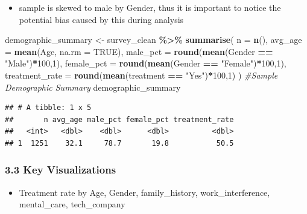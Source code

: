 \documentclass[
]{article}
\newenvironment{Shaded}{\begin{snugshade}}{\end{snugshade}}
\newcommand{\AttributeTok}[1]{\textcolor[rgb]{0.13,0.29,0.53}{#1}}
\newcommand{\CommentTok}[1]{\textcolor[rgb]{0.56,0.35,0.01}{\textit{#1}}}
\newcommand{\ConstantTok}[1]{\textcolor[rgb]{0.56,0.35,0.01}{#1}}
\newcommand{\DecValTok}[1]{\textcolor[rgb]{0.00,0.00,0.81}{#1}}
\newcommand{\FunctionTok}[1]{\textcolor[rgb]{0.13,0.29,0.53}{\textbf{#1}}}
\newcommand{\NormalTok}[1]{#1}
\newcommand{\OtherTok}[1]{\textcolor[rgb]{0.56,0.35,0.01}{#1}}
\newcommand{\SpecialCharTok}[1]{\textcolor[rgb]{0.81,0.36,0.00}{\textbf{#1}}}
\newcommand{\StringTok}[1]{\textcolor[rgb]{0.31,0.60,0.02}{#1}}
\providecommand{\tightlist}{%
  \setlength{\itemsep}{0pt}\setlength{\parskip}{0pt}}
\begin{document}
\begin{itemize}
\tightlist
\item
  sample is skewed to male by Gender, thus it is important to notice the
  potential bias caused by this during analysis
\end{itemize}

\begin{Shaded}
\begin{Highlighting}[]
\NormalTok{demographic\_summary }\OtherTok{\textless{}{-}}\NormalTok{ survey\_clean }\SpecialCharTok{\%\textgreater{}\%}
  \FunctionTok{summarise}\NormalTok{(}
    \AttributeTok{n =} \FunctionTok{n}\NormalTok{(),}
    \AttributeTok{avg\_age =} \FunctionTok{mean}\NormalTok{(Age, }\AttributeTok{na.rm =} \ConstantTok{TRUE}\NormalTok{),}
    \AttributeTok{male\_pct =} \FunctionTok{round}\NormalTok{(}\FunctionTok{mean}\NormalTok{(Gender }\SpecialCharTok{==} \StringTok{"Male"}\NormalTok{)}\SpecialCharTok{*}\DecValTok{100}\NormalTok{,}\DecValTok{1}\NormalTok{),}
    \AttributeTok{female\_pct =} \FunctionTok{round}\NormalTok{(}\FunctionTok{mean}\NormalTok{(Gender }\SpecialCharTok{==} \StringTok{"Female"}\NormalTok{)}\SpecialCharTok{*}\DecValTok{100}\NormalTok{,}\DecValTok{1}\NormalTok{),}
    \AttributeTok{treatment\_rate =} \FunctionTok{round}\NormalTok{(}\FunctionTok{mean}\NormalTok{(treatment }\SpecialCharTok{==} \StringTok{"Yes"}\NormalTok{)}\SpecialCharTok{*}\DecValTok{100}\NormalTok{,}\DecValTok{1}\NormalTok{)}
\NormalTok{  )}
\CommentTok{\#Sample Demographic Summary}
\NormalTok{demographic\_summary}
\end{Highlighting}
\end{Shaded}

\begin{verbatim}
## # A tibble: 1 x 5
##       n avg_age male_pct female_pct treatment_rate
##   <int>   <dbl>    <dbl>      <dbl>          <dbl>
## 1  1251    32.1     78.7       19.8           50.5
\end{verbatim}

\subsubsection{3.3 Key Visualizations}\label{key-visualizations}

\begin{itemize}
\tightlist
\item
  Treatment rate by Age, Gender, family\_history, work\_interference,
  mental\_care, tech\_company
\end{itemize}
\end{document}
